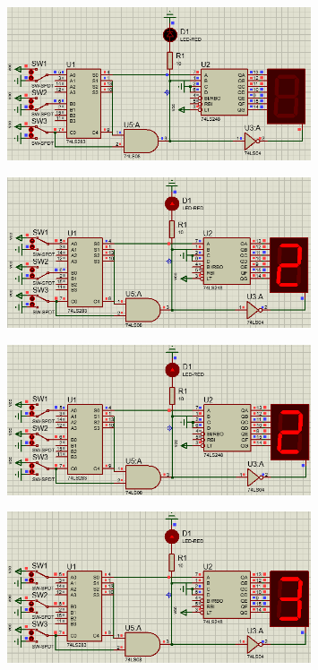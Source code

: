 \documentclass[UTF8, a4paper, 11pt]{article}
\begin{document}
\begin{figure}[H]
    \centering
    \includegraphics[width=0.8\textwidth]{100.png}
\end{figure}
\begin{figure}[H]
    \centering
    \includegraphics[width=0.8\textwidth]{101.png}
\end{figure}
\begin{figure}[H]
    \centering
    \includegraphics[width=0.8\textwidth]{110.png}
\end{figure}
\begin{figure}[H]
    \centering
    \includegraphics[width=0.8\textwidth]{111.png}
\end{figure}
\end{document}
